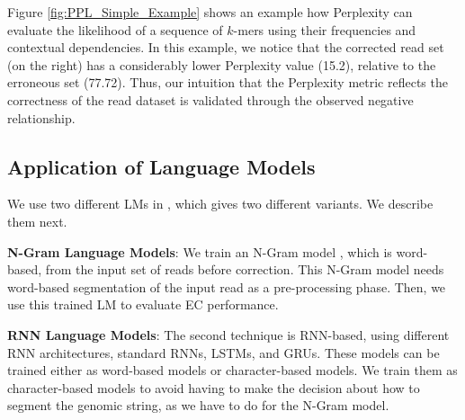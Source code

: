 Figure \ref{fig:PPL_Simple_Example} shows an example how Perplexity can evaluate the likelihood of a sequence of $k$-mers using their frequencies and contextual dependencies. In this example, we notice that the corrected read set (\ie on the right) has a considerably lower Perplexity value (15.2), relative to the erroneous set (77.72). Thus, our intuition that the Perplexity metric reflects the correctness of the read dataset is validated through the observed negative relationship.


\subsection{Application of Language Models}
We use two different LMs in \name, which gives two different variants. We describe them next.

\noindent \textbf{N-Gram Language Models}: %
We train an N-Gram model \cite{brown1992class}, which is word-based, from the input set of reads before correction. This N-Gram model needs word-based segmentation of the input read as a pre-processing phase. Then, we use this trained LM to evaluate EC performance.

\noindent \textbf{RNN Language Models}: The second technique is RNN-based, using different RNN architectures, \eg standard RNNs, LSTMs, and GRUs.
These models can be trained either as word-based models or character-based models. We train them as character-based models to avoid having to make the decision about how to segment the genomic string, as we have to do for the N-Gram model.


